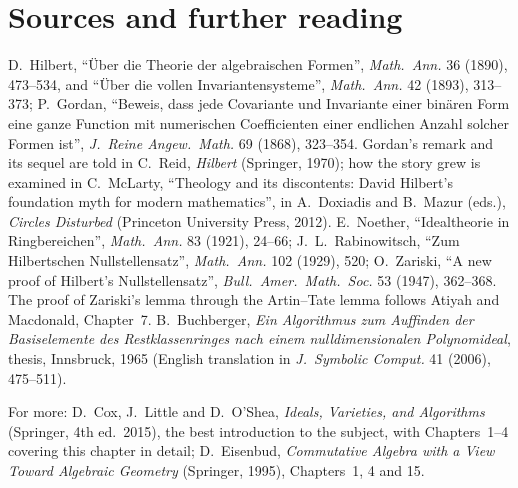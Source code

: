 \section*{Sources and further reading}

D.~Hilbert, ``Über die Theorie der algebraischen Formen'', \emph{Math.\ Ann.} 36 (1890), 473--534, and ``Über die vollen Invariantensysteme'', \emph{Math.\ Ann.} 42 (1893), 313--373; P.~Gordan, ``Beweis, dass jede Covariante und
Invariante einer binären Form eine ganze Function mit numerischen Coefficienten einer endlichen Anzahl solcher Formen ist'', \emph{J.\ Reine Angew.\ Math.} 69 (1868), 323--354. Gordan's remark and its sequel are told in
C.~Reid, \emph{Hilbert} (Springer, 1970); how the story grew is examined in C.~McLarty, ``Theology and its discontents: David Hilbert's foundation myth for modern
mathematics'', in A.~Doxiadis and B.~Mazur (eds.), \emph{Circles Disturbed} (Princeton University Press, 2012). E.~Noether, ``Idealtheorie in Ringbereichen'', \emph{Math.\ Ann.} 83 (1921), 24--66;
J.~L.~Rabinowitsch, ``Zum Hilbertschen Nullstellensatz'', \emph{Math.\ Ann.} 102 (1929), 520; O.~Zariski, ``A new proof of Hilbert's Nullstellensatz'', \emph{Bull.\ Amer.\ Math.\ Soc.} 53 (1947), 362--368. The proof of
Zariski's lemma through the Artin--Tate lemma follows Atiyah and Macdonald, Chapter~7. B.~Buchberger, \emph{Ein Algorithmus zum Auffinden der Basiselemente des Restklassenringes nach einem nulldimensionalen Polynomideal},
thesis, Innsbruck, 1965 (English translation in \emph{J.\ Symbolic Comput.} 41 (2006), 475--511).

For more: D.~Cox, J.~Little and D.~O'Shea, \emph{Ideals, Varieties, and Algorithms} (Springer, 4th ed.\ 2015), the best introduction to the subject, with Chapters~1--4 covering this chapter in detail; D.~Eisenbud,
\emph{Commutative Algebra with a View Toward Algebraic Geometry} (Springer, 1995), Chapters~1, 4 and 15.
